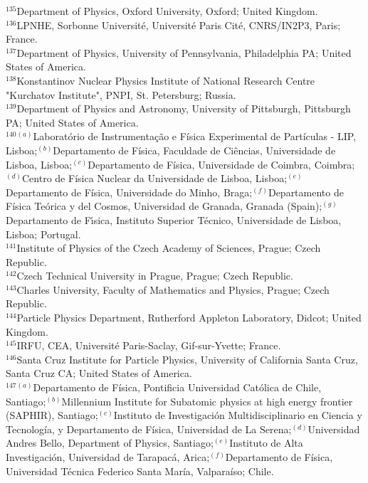\begin{flushleft}
$^{135}$Department of Physics, Oxford University, Oxford; United Kingdom.\\
$^{136}$LPNHE, Sorbonne Universit\'e, Universit\'e Paris Cit\'e, CNRS/IN2P3, Paris; France.\\
$^{137}$Department of Physics, University of Pennsylvania, Philadelphia PA; United States of America.\\
$^{138}$Konstantinov Nuclear Physics Institute of National Research Centre "Kurchatov Institute", PNPI, St. Petersburg; Russia.\\
$^{139}$Department of Physics and Astronomy, University of Pittsburgh, Pittsburgh PA; United States of America.\\
$^{140}$$^{(a)}$Laborat\'orio de Instrumenta\c{c}\~ao e F\'isica Experimental de Part\'iculas - LIP, Lisboa;$^{(b)}$Departamento de F\'isica, Faculdade de Ci\^{e}ncias, Universidade de Lisboa, Lisboa;$^{(c)}$Departamento de F\'isica, Universidade de Coimbra, Coimbra;$^{(d)}$Centro de F\'isica Nuclear da Universidade de Lisboa, Lisboa;$^{(e)}$Departamento de F\'isica, Universidade do Minho, Braga;$^{(f)}$Departamento de F\'isica Te\'orica y del Cosmos, Universidad de Granada, Granada (Spain);$^{(g)}$Departamento de F\'{\i}sica, Instituto Superior T\'ecnico, Universidade de Lisboa, Lisboa; Portugal.\\
$^{141}$Institute of Physics of the Czech Academy of Sciences, Prague; Czech Republic.\\
$^{142}$Czech Technical University in Prague, Prague; Czech Republic.\\
$^{143}$Charles University, Faculty of Mathematics and Physics, Prague; Czech Republic.\\
$^{144}$Particle Physics Department, Rutherford Appleton Laboratory, Didcot; United Kingdom.\\
$^{145}$IRFU, CEA, Universit\'e Paris-Saclay, Gif-sur-Yvette; France.\\
$^{146}$Santa Cruz Institute for Particle Physics, University of California Santa Cruz, Santa Cruz CA; United States of America.\\
$^{147}$$^{(a)}$Departamento de F\'isica, Pontificia Universidad Cat\'olica de Chile, Santiago;$^{(b)}$Millennium Institute for Subatomic physics at high energy frontier (SAPHIR), Santiago;$^{(c)}$Instituto de Investigaci\'on Multidisciplinario en Ciencia y Tecnolog\'ia, y Departamento de F\'isica, Universidad de La Serena;$^{(d)}$Universidad Andres Bello, Department of Physics, Santiago;$^{(e)}$Instituto de Alta Investigaci\'on, Universidad de Tarapac\'a, Arica;$^{(f)}$Departamento de F\'isica, Universidad T\'ecnica Federico Santa Mar\'ia, Valpara\'iso; Chile.\\

\end{flushleft}
